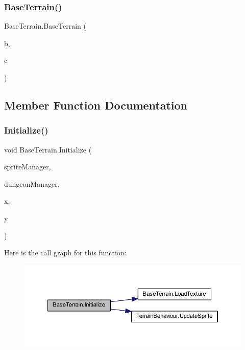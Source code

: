 \subsubsection{\texorpdfstring{BaseTerrain()}{BaseTerrain()}}
{\footnotesize\ttfamily Base\+Terrain.\+Base\+Terrain (\begin{DoxyParamCaption}\item[{\mbox{\hyperlink{class_biome}{Biome}}}]{b,  }\item[{string}]{c }\end{DoxyParamCaption})}



\subsection{Member Function Documentation}
\mbox{\label{class_base_terrain_aff9e343986e2b76d0fc22be3a5e246dc}} 
\subsubsection{\texorpdfstring{Initialize()}{Initialize()}}
{\footnotesize\ttfamily void Base\+Terrain.\+Initialize (\begin{DoxyParamCaption}\item[{\mbox{\hyperlink{class_sprite_manager}{Sprite\+Manager}}}]{sprite\+Manager,  }\item[{\mbox{\hyperlink{class_dungeon_manager}{Dungeon\+Manager}}}]{dungeon\+Manager,  }\item[{int}]{x,  }\item[{int}]{y }\end{DoxyParamCaption})}

Here is the call graph for this function\+:\nopagebreak
\begin{figure}[H]
\begin{center}
\leavevmode
\includegraphics[width=350pt]{class_base_terrain_aff9e343986e2b76d0fc22be3a5e246dc_cgraph}
\end{center}
\end{figure}
\mbox{\label{class_base_terrain_ada3cddbd511be2890cbb9635d997441b}} 
